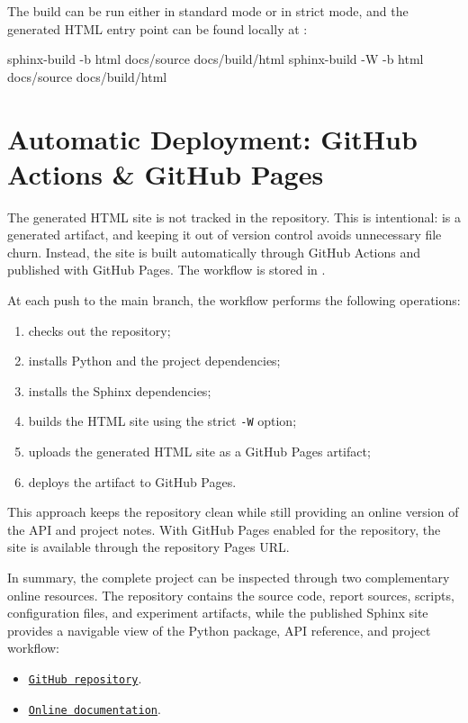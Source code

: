 The build can be run either in standard mode or in strict mode, and the generated HTML entry point can be found locally at :

\begin{projectlistingbox}[shellstyle]
sphinx-build -b html docs/source docs/build/html
sphinx-build -W -b html docs/source docs/build/html
\end{projectlistingbox}

\section{Automatic Deployment: GitHub Actions \& GitHub Pages}

The generated HTML site is not tracked in the repository.
This is intentional:  is a generated artifact, and keeping it out of version control avoids unnecessary file churn.
Instead, the site is built automatically through GitHub Actions and published with GitHub Pages.
The workflow is stored in \href{https://github.com/matteogiorgi/nn-option-pricing/blob/main/.github/workflows/docs.yml}{}.

At each push to the main branch, the workflow performs the following operations:

\begin{enumerate}
    \item checks out the repository;
    \item installs Python and the project dependencies;
    \item installs the Sphinx dependencies;
    \item builds the HTML site using the strict \texttt{-W} option;
    \item uploads the generated HTML site as a GitHub Pages artifact;
    \item deploys the artifact to GitHub Pages.
\end{enumerate}
This approach keeps the repository clean while still providing an online version of the API and project notes.
With GitHub Pages enabled for the repository, the site is available through the repository Pages URL.

In summary, the complete project can be inspected through two complementary online resources.
The repository contains the source code, report sources, scripts, configuration files, and experiment artifacts,
while the published Sphinx site provides a navigable view of the Python package, API reference, and project workflow:

\begin{itemize}
    \item \href{https://github.com/matteogiorgi/nn-option-pricing}{\texttt{GitHub repository}}.
    \item \href{https://matteogiorgi.github.io/nn-option-pricing}{\texttt{Online documentation}}.
\end{itemize}
